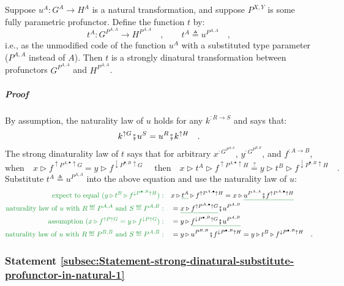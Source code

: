 Suppose $u^{A}:G^{A}\rightarrow H^{A}$ is a natural transformation,
and suppose $P^{X,Y}$ is some fully parametric profunctor. Define
the function $t$ by:
\[
t^{A}:G^{P^{A,A}}\rightarrow H^{P^{A,A}}\quad,\quad\quad t^{A}\triangleq u^{P^{A,A}}\quad,
\]
i.e., as the unmodified code of the function $u^{A}$ with a substituted
type parameter ($P^{A,A}$ instead of $A$). Then $t$ is a strongly
dinatural transformation between profunctors $G^{P^{A,A}}$ and $H^{P^{A,A}}$.

\subparagraph{Proof}

By assumption, the naturality law of $u$ holds for any $k^{:R\rightarrow S}$
and says that:
\[
k^{\uparrow G}\bef u^{S}=u^{R}\bef k^{\uparrow H}\quad.
\]
The strong dinaturality law of $t$ says that for arbitrary $x^{:G^{P^{A,A}}}$,
$y^{:G^{P^{B,B}}}$, and $f^{:A\rightarrow B}$,
\[
\text{when}\quad x\triangleright f^{\uparrow P^{A,\bullet}\uparrow G}=y\triangleright f^{\downarrow P^{\bullet,B}\uparrow G}\quad\text{ then}\quad x\triangleright t^{A}\triangleright f^{\uparrow P^{A,\bullet}\uparrow H}\overset{?}{=}y\triangleright t^{B}\triangleright f^{\downarrow P^{\bullet,B}\uparrow H}\quad.
\]
Substitute $t^{A}\triangleq u^{P^{A,A}}$ into the above equation
and use the naturality law of $u$:
\begin{align*}
{\color{greenunder}\text{expect to equal }(y\triangleright t^{B}\triangleright f^{\downarrow P^{\bullet,B}\uparrow H}):}\quad & x\triangleright\gunderline{t^{A}}\triangleright f^{\uparrow P^{A,\bullet}\uparrow H}=x\triangleright\gunderline{u^{P^{A,A}}\bef f^{\uparrow P^{A,\bullet}\uparrow H}}\\
{\color{greenunder}\text{naturality law of }u\text{ with }R\triangleq P^{A,A}\text{ and }S\triangleq P^{A,B}:}\quad & =\gunderline{x\triangleright f^{\uparrow P^{A,\bullet}\uparrow G}}\bef u^{P^{A,B}}\\
{\color{greenunder}\text{assumption }(x\triangleright f^{\uparrow P\uparrow G}=y\triangleright f^{\downarrow P\uparrow G}):}\quad & =y\triangleright\gunderline{f^{\downarrow P^{\bullet,B}\uparrow G}\bef u^{P^{A,B}}}\\
{\color{greenunder}\text{naturality law of }u\text{ with }R\triangleq P^{B,B}\text{ and }S\triangleq P^{A,B}:}\quad & =y\triangleright u^{P^{B,B}}\bef f^{\downarrow P^{\bullet,B}\uparrow H}=y\triangleright t^{B}\triangleright f^{\downarrow P^{\bullet,B}\uparrow H}\quad.
\end{align*}


\subsubsection{Statement \label{subsec:Statement-strong-dinatural-substitute-profunctor-in-natural-1}\ref{subsec:Statement-strong-dinatural-substitute-profunctor-in-natural-1}}

